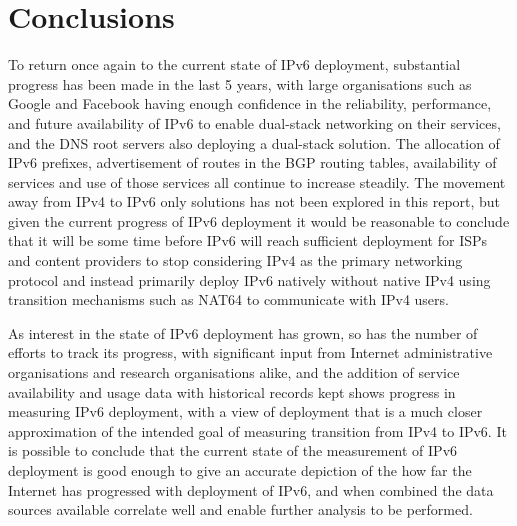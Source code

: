 \section{Conclusions}


To return once again to the current state of IPv6 deployment, substantial
progress has been made in the last 5 years, with large organisations such as
Google and Facebook having enough confidence in the reliability, performance,
and future availability of IPv6 to enable dual-stack networking on their
services, and the DNS root servers also deploying a dual-stack solution. The
allocation of IPv6 prefixes, advertisement of routes in the BGP routing tables,
availability of services and use of those services all continue to increase
steadily. The movement away from IPv4 to IPv6 only solutions has not been
explored in this report, but given the current progress of IPv6 deployment it
would be reasonable to conclude that it will be some time before IPv6 will reach
sufficient deployment for ISPs and content providers to stop considering IPv4 as
the primary networking protocol and instead primarily deploy IPv6 natively
without native IPv4 using transition mechanisms such as NAT64 to communicate
with IPv4 users.

As interest in
the state of IPv6 deployment has grown, so has the number of efforts to track
its progress, with significant input from Internet administrative organisations
and research organisations alike, and the addition of service availability and
usage data with historical records kept shows progress in measuring IPv6
deployment, with a view of deployment that is a much closer 
approximation of the intended goal of measuring transition from IPv4 to IPv6.
It is possible to conclude that the current state of the measurement of IPv6
deployment is good enough to give an accurate depiction of the how far the
Internet has progressed with deployment of IPv6, and when combined the data
sources available correlate well and enable further analysis to be performed.

